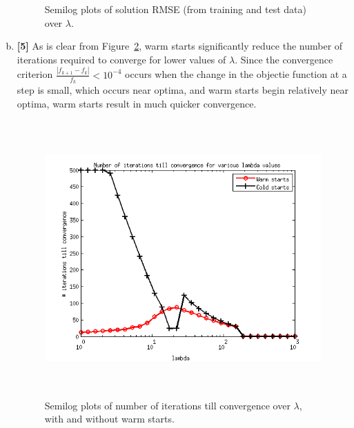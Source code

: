 \documentclass[11pt]{article}
\begin{document}
\begin{enumerate}[(a)]
\begin{figure}[h!]
\begin{center}
\end{center}
\caption{Semilog plots of solution RMSE (from training and test data) over
$\lambda$.}
\label{fig:RMSEs}
\end{figure}

\item {\bf [5]} As is clear from Figure~\ref{fig:warm_num_iters}, warm starts
significantly reduce the number of iterations required to converge for lower
values of $\lambda$. Since the convergence criterion
$\frac{|f_{k + 1} - f_k|}{f_k} < 10^{-4}$ occurs when the change in the
objectie function at a step is small, which occurs near optima, and warm starts
begin relatively near optima, warm starts result in much quicker convergence.
\begin{figure}[h!]
\begin{center}
\includegraphics[width=400pt,height=300pt]{3c}
\end{center}
\caption{Semilog plots of number of iterations till convergence over $\lambda$,
with and without warm starts.}
\label{fig:warm_num_iters}
\end{figure}
\end{enumerate}
\end{document}
